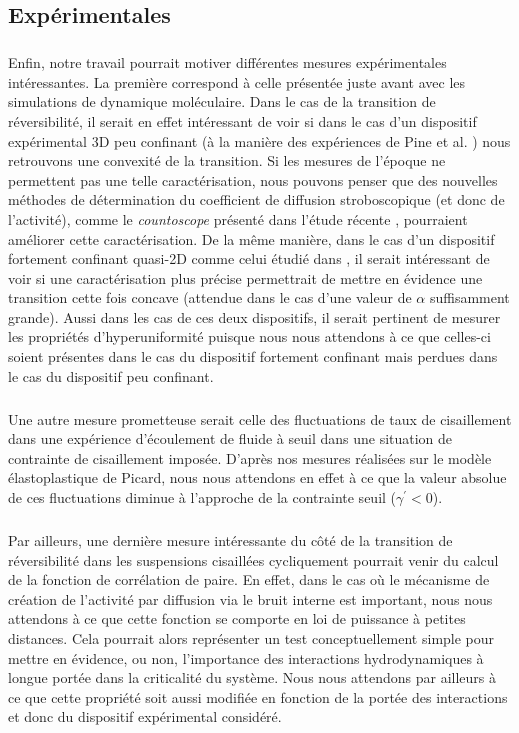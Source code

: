 \subsection*{Expérimentales}

\subparagraph{}Enfin, notre travail pourrait motiver différentes mesures expérimentales intéressantes. La première correspond à celle présentée juste avant avec les simulations de dynamique moléculaire. Dans le cas de la transition de réversibilité, il serait en effet intéressant de voir si dans le cas d'un dispositif expérimental 3D peu confinant (à la manière des expériences de Pine et al. \cite{pine_chaos_2005}) nous retrouvons une convexité de la transition. Si les mesures de l'époque ne permettent pas une telle caractérisation, nous pouvons penser que des nouvelles méthodes de détermination du coefficient de diffusion stroboscopique (et donc de l'activité), comme le \textit{countoscope} présenté dans l'étude récente \cite{mackay_countoscope_2024}, pourraient améliorer cette caractérisation. De la même manière, dans le cas d'un dispositif fortement confinant quasi-2D comme celui étudié dans \cite{jeanneret_geometrically_2014, weijs_emergent_2015}, il serait intéressant de voir si une caractérisation plus précise permettrait de mettre en évidence une transition cette fois concave (attendue dans le cas d'une valeur de $\alpha$ suffisamment grande). Aussi dans les cas de ces deux dispositifs, il serait pertinent de mesurer les propriétés d'hyperuniformité puisque nous nous attendons à ce que celles-ci soient présentes dans le cas du dispositif fortement confinant mais perdues dans le cas du dispositif peu confinant.

\subparagraph{}Une autre mesure prometteuse serait celle des fluctuations de taux de cisaillement dans une expérience d'écoulement de fluide à seuil dans une situation de contrainte de cisaillement imposée. D'après nos mesures réalisées sur le modèle élastoplastique de Picard, nous nous attendons en effet à ce que la valeur absolue de ces fluctuations diminue à l'approche de la contrainte seuil ($\gamma^\prime < 0$).

\subparagraph{}Par ailleurs, une dernière mesure intéressante du côté de la transition de réversibilité dans les suspensions cisaillées cycliquement pourrait venir du calcul de la fonction de corrélation de paire. En effet, dans le cas où le mécanisme de création de l'activité par diffusion via le bruit interne est important, nous nous attendons à ce que cette fonction se comporte en loi de puissance à petites distances. Cela pourrait alors représenter un test conceptuellement simple pour mettre en évidence, ou non, l'importance des interactions hydrodynamiques à longue portée dans la criticalité du système. Nous nous attendons par ailleurs à ce que cette propriété soit aussi modifiée en fonction de la portée des interactions et donc du dispositif expérimental considéré.


